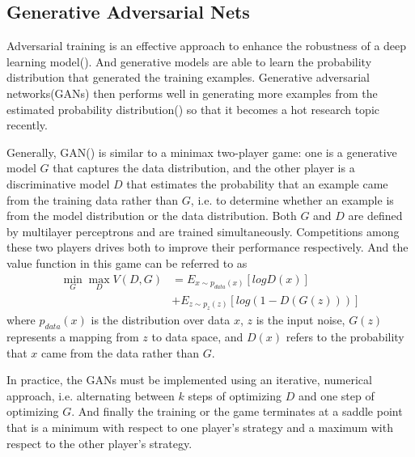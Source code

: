 

\subsection{Generative Adversarial Nets}
Adversarial training is an effective approach to enhance the robustness of a deep learning model(\citealp{bai2021recent}). And generative models are able to learn the probability distribution that generated the training examples. Generative adversarial networks(GANs) then performs well in generating more examples from the estimated probability distribution(\citealp{goodfellow2020generative}) so that it becomes a hot research topic recently.

Generally, GAN(\citealp{10.5555/2969033.2969125}) is similar to a minimax two-player game: one is a generative model $G$ that captures the data distribution, and the other player is a discriminative model $D$ that estimates the probability that an example came from the training data rather than $G$, i.e. to determine whether an example is from the model distribution or the data distribution. Both $G$ and $D$ are defined by multilayer perceptrons and are trained simultaneously. Competitions among these two players drives both to improve their performance respectively. And the value function in this game can be referred to as
\begin{equation}
\begin{split}
\mathop{min}\limits_{G}\mathop{max}\limits_{D}V(D,G)&=E_{x\sim p_{data}(x)}[log D(x)]\\ &+E_{z\sim p_{z}(z)}[log (1-D(G(z)))]
\end{split}
\end{equation}
where $p_{data}(x)$ is the distribution over data $x$, $z$ is the input noise, $G(z)$ represents a mapping from $z$ to data space, and $D(x)$ refers to the probability that $x$ came from the data rather than $G$.

In practice, the GANs must be implemented using an iterative, numerical approach, i.e. alternating between $k$ steps of optimizing $D$ and one step of optimizing $G$. And finally the training or the game terminates at a saddle point that is a minimum with respect to one player's strategy and a maximum with respect to the other player's strategy.

